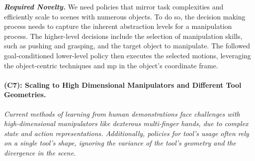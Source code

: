 \documentclass{erc-B2}
\begin{document}
\textit{\textbf{Required Novelty.}} We need policies that mirror task complexities and efficiently scale to scenes with numerous objects. To do so, the decision making process needs to capture the inherent abstraction levels for a manipulation process. The higher-level decisions include the selection of manipulation skills, such as pushing and grasping, and the target object to manipulate. The followed goal-conditioned lower-level policy then executes the selected motions, leveraging the object-centric techniques and \gls*{mp} in the object's coordinate frame. %

\paragraph{(C7): Scaling to High Dimensional Manipulators and Different Tool Geometries.} %
\textit{Current methods of learning from human demonstrations \cite{mandlekar2021matters} face challenges with high-dimensional manipulators like dexterous multi-finger hands, due to complex state and action representations. Additionally, policies for tool's usage often rely on a single tool's shape, ignoring the variance of the tool's geometry and the divergence in the scene.}
\end{document}
